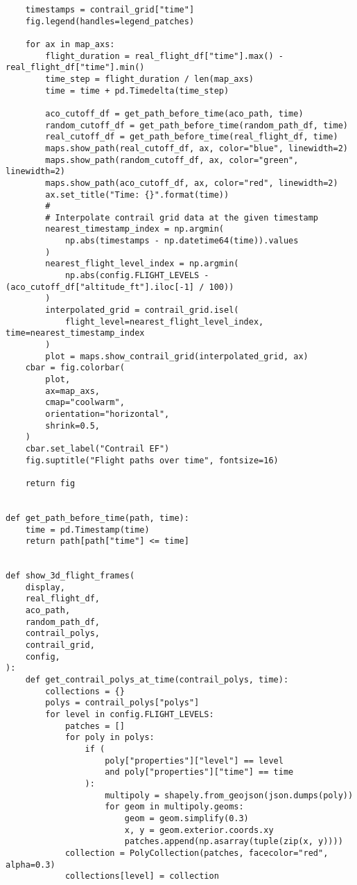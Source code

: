 \begin{verbatim}
    timestamps = contrail_grid["time"]
    fig.legend(handles=legend_patches)

    for ax in map_axs:
        flight_duration = real_flight_df["time"].max() - real_flight_df["time"].min()
        time_step = flight_duration / len(map_axs)
        time = time + pd.Timedelta(time_step)

        aco_cutoff_df = get_path_before_time(aco_path, time)
        random_cutoff_df = get_path_before_time(random_path_df, time)
        real_cutoff_df = get_path_before_time(real_flight_df, time)
        maps.show_path(real_cutoff_df, ax, color="blue", linewidth=2)
        maps.show_path(random_cutoff_df, ax, color="green", linewidth=2)
        maps.show_path(aco_cutoff_df, ax, color="red", linewidth=2)
        ax.set_title("Time: {}".format(time))
        #
        # Interpolate contrail grid data at the given timestamp
        nearest_timestamp_index = np.argmin(
            np.abs(timestamps - np.datetime64(time)).values
        )
        nearest_flight_level_index = np.argmin(
            np.abs(config.FLIGHT_LEVELS - (aco_cutoff_df["altitude_ft"].iloc[-1] / 100))
        )
        interpolated_grid = contrail_grid.isel(
            flight_level=nearest_flight_level_index, time=nearest_timestamp_index
        )
        plot = maps.show_contrail_grid(interpolated_grid, ax)
    cbar = fig.colorbar(
        plot,
        ax=map_axs,
        cmap="coolwarm",
        orientation="horizontal",
        shrink=0.5,
    )
    cbar.set_label("Contrail EF")
    fig.suptitle("Flight paths over time", fontsize=16)

    return fig


def get_path_before_time(path, time):
    time = pd.Timestamp(time)
    return path[path["time"] <= time]


def show_3d_flight_frames(
    display,
    real_flight_df,
    aco_path,
    random_path_df,
    contrail_polys,
    contrail_grid,
    config,
):
    def get_contrail_polys_at_time(contrail_polys, time):
        collections = {}
        polys = contrail_polys["polys"]
        for level in config.FLIGHT_LEVELS:
            patches = []
            for poly in polys:
                if (
                    poly["properties"]["level"] == level
                    and poly["properties"]["time"] == time
                ):
                    multipoly = shapely.from_geojson(json.dumps(poly))
                    for geom in multipoly.geoms:
                        geom = geom.simplify(0.3)
                        x, y = geom.exterior.coords.xy
                        patches.append(np.asarray(tuple(zip(x, y))))
            collection = PolyCollection(patches, facecolor="red", alpha=0.3)
            collections[level] = collection


\end{verbatim}
